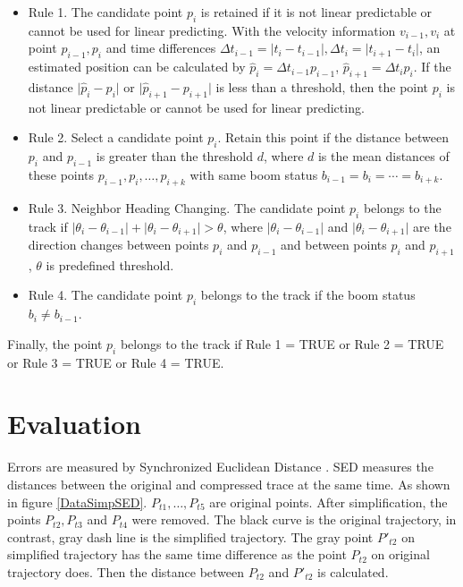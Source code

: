 \begin{itemize}
\item Rule 1. The candidate point $p_i$ is retained if it is not linear predictable or cannot be used for linear predicting. With the velocity information $v_{i-1}, v_i$ at point $p_{i-1}, p_i$ and time differences $\Delta t_{i-1} = \lvert t_{i}-t_{i-1} \rvert,\Delta t_{i} = \lvert t_{i+1}-t_{i}\rvert$, an estimated position can be calculated by $\hat{p}_i=\Delta t_{i-1} p_{i-1}$, $\hat{p}_{i+1}=\Delta t_{i} p_{i}$. If the distance $\lvert \hat{p}_i-p_i\rvert$ or $\lvert \hat{p}_{i+1}-p_{i+1}\rvert$ is less than a threshold, then the point $p_i$ is not linear predictable or cannot be used for linear predicting.

\item Rule 2. Select a candidate point $p_i$. Retain this point if the distance between $p_i$ and $p_{i-1}$ is greater than the threshold $d$, where $d$ is the mean distances of these points $p_{i-1}, p_i, \ldots, p_{i+k}$ with same boom status $b_{i-1}=b_i=\cdots=b_{i+k}$. 

\item Rule 3. Neighbor Heading Changing. The candidate point $p_i$ belongs to the track if $\lvert \theta_i-\theta_{i-1}\rvert  + \lvert \theta_i-\theta_{i+1}\rvert >\theta$, where $\lvert \theta_i-\theta_{i-1}\rvert$ and $ \lvert \theta_i-\theta_{i+1}\rvert $ are the direction changes between points $p_i$ and $p_{i-1}$ and between points $p_i$ and $p_{i+1}$, $\theta$ is predefined threshold.

\item Rule 4. The candidate point $p_i$ belongs to the track if the boom status $b_i\neq b_{i-1}$.
\end{itemize}

Finally, the point $p_i$ belongs to the track if Rule 1 = TRUE or Rule 2 = TRUE or Rule 3 = TRUE or Rule 4 = TRUE.


\section{Evaluation}

Errors are measured by Synchronized Euclidean Distance \cite{lawson2011compression}. SED measures the distances between the original and compressed trace at the same time. As shown in figure \ref{DataSimpSED}. $P_{t1}, \ldots ,P_{t5}$ are original points. After simplification, the points $P_{t2}, P_{t3}$ and $P_{t4}$ were removed. The black curve is the original trajectory, in contrast, gray dash line is the simplified trajectory. The gray point $P'_{t2}$ on simplified trajectory has the same time difference as the point $P_{t2}$ on original trajectory does. Then the distance between $P_{t2}$ and $P'_{t2}$ is calculated.


